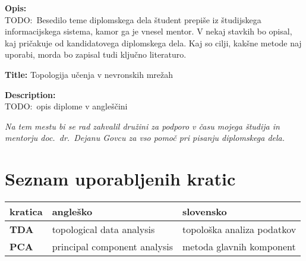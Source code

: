 \bigskip
\noindent\textbf{Opis:}\\
TODO:\ Besedilo teme diplomskega dela študent prepiše iz študijskega informacijskega sistema, kamor ga je vnesel mentor.
V nekaj stavkih bo opisal, kaj pričakuje od kandidatovega diplomskega dela.
Kaj so cilji, kakšne metode naj uporabi, morda bo zapisal tudi ključno literaturo.

\bigskip
\noindent\textbf{Title:} Topologija učenja v nevronskih mrežah

\bigskip
\noindent\textbf{Description:}\\
TODO:\ opis diplome v angleščini

\vfill



\vspace{2cm}

\clearemptydoublepage{}

\thispagestyle{empty}\mbox{}\vfill\null\it%
\noindent
Na tem mestu bi se rad zahvalil družini za podporo v času mojega študija in mentorju doc.\ dr.\ Dejanu Govcu za vso pomoč pri pisanju diplomskega dela.
\rm\normalfont{}

\clearemptydoublepage{}

\clearemptydoublepage{}


\pagestyle{empty}
\def\thepage{}%
\tableofcontents{}


\clearemptydoublepage{}

\chapter*{Seznam uporabljenih kratic}

\noindent\begin{tabular}{p{}|p{}|p{}}    %
  {\bf kratica} & {\bf angleško}               & {\bf slovensko}            \\ \hline
  {\bf TDA}     & topological data analysis    & topološka analiza podatkov \\
  {\bf PCA}     & principal component analysis & metoda glavnih komponent   \\

\end{tabular}



